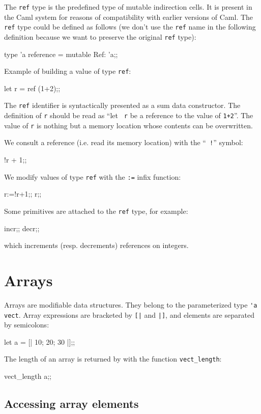 The {\tt ref} type is the predefined type of mutable indirection
cells.  It is present in the Caml system for reasons of compatibility
with earlier versions of Caml. The {\tt ref} type could be defined as
follows (we don't use the {\tt ref} name in the following definition
because we want to preserve the original {\tt ref} type):
\begin{caml_example}
type 'a reference = {mutable Ref: 'a};;
\end{caml_example}
Example of building a value of type {\tt ref}:
\begin{caml_example}
let r = ref (1+2);;
\end{caml_example}
The {\tt ref} identifier is syntactically presented as a sum data
constructor.  The definition of {\tt r} should be read as ``let {\tt
r} be a reference to the value of {\tt 1+2}''.  The value of {\tt r}
is nothing but a memory location whose contents can be overwritten.

We consult a reference (i.e. read its memory location) with the ``{\tt
!}'' symbol:
\begin{caml_example}
!r + 1;;
\end{caml_example}

We modify values of type {\tt ref} with the {\tt :=} infix function:
\begin{caml_example}
r:=!r+1;;
r;;
\end{caml_example}
Some primitives are attached to the {\tt ref} type, for example:
\begin{caml_example}
incr;;
decr;;
\end{caml_example}
which increments (resp. decrements) references on integers.

\section{Arrays}

Arrays are modifiable data structures. They belong to the
parameterized type \verb|'a vect|. Array expressions are bracketed by
\verb'[|' and \verb'|]', and elements are separated by semicolons:
\begin{caml_example}
let a = [| 10; 20; 30 |];;
\end{caml_example}
The length of an array is returned by with the function \verb|vect_length|:
\begin{caml_example}
vect_length a;;
\end{caml_example}


\subsection{Accessing array elements}

